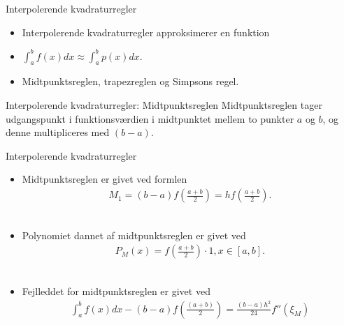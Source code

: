 
\begin{frame}{Interpolerende kvadraturregler}

\begin{itemize}
    \item Interpolerende kvadraturregler approksimerer en funktion %
    \item $ \int_{a}^{b} f(x) dx \approx \int_{a}^{b} p(x) dx. $
    \item Midtpunktsreglen, trapezreglen og Simpsons regel. 
    \end{itemize}
\end{frame}


\begin{frame}{Interpolerende kvadraturregler: Midtpunktsreglen}
    Midtpunktsreglen tager udgangspunkt i funktionsværdien i midtpunktet mellem to punkter $a$ og $b$, og denne multipliceres med $(b-a)$.
    
\end{frame}


\begin{frame}{Interpolerende kvadraturregler}
\begin{itemize}
    \item Midtpunktsreglen er givet ved formlen
    \begin{align*}
        M_1 = (b-a)f(\frac{a+b}{2})=hf(\frac{a+b}{2}).    
    \end{align*}
    \\
    \item Polynomiet dannet af midtpunktsreglen er givet ved 
    \begin{align*}
        P_{M}(x)=f(\frac{a+b}{2}) \cdot 1, x \in \left [a,b  \right ].
    \end{align*}
    \\
    \item Fejlleddet for midtpunktsreglen er givet ved 
    \begin{align*}
        \int_{a}^{b}f(x)dx-(b-a)f(\frac{(a+b)}{2})=\frac{(b-a)h^2}{24}{f}''(\xi_M)
    \end{align*}
\end{itemize}
\end{frame}



